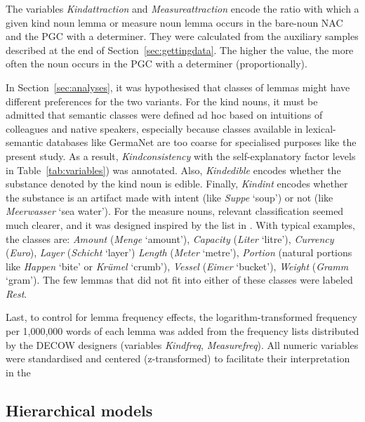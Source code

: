 \documentclass[USenglish]{article}
\begin{document}
The variables \textit{Kindattraction} and \textit{Measureattraction} encode the ratio with which a given kind noun lemma or measure noun lemma occurs in the bare-noun NAC and the PGC with a determiner.
They were calculated from the auxiliary samples described at the end of Section~\ref{sec:gettingdata}.
The higher the value, the more often the noun occurs in the PGC with a determiner (proportionally).

In Section~\ref{sec:analyses}, it was hypothesised that classes of lemmas might have different preferences for the two variants.
For the kind nouns, it must be admitted that semantic classes were defined ad hoc based on intuitions of colleagues and native speakers, especially because classes available in lexical-semantic databases like GermaNet \citep{HampFeldweg1997} are too coarse for specialised purposes like the present study.
As a result, \textit{Kindconsistency} with the self-explanatory factor levels in Table~\ref{tab:variables}) was annotated.
Also, \textit{Kindedible} encodes whether the substance denoted by the kind noun is edible.
Finally, \textit{Kindint} encodes whether the substance is an artifact made with intent (like \textit{Suppe} `soup') or not (like \textit{Meerwasser} `sea water').
For the measure nouns, relevant classification seemed much clearer, and it was designed inspired by the list in \cite[530]{Koptjevskaja2001}.
With typical examples, the classes are:
\textit{Amount} (\textit{Menge} `amount'), 
\textit{Capacity} (\textit{Liter} `litre'), 
\textit{Currency} (\textit{Euro}), 
\textit{Layer} (\textit{Schicht} `layer')
\textit{Length} (\textit{Meter} `metre'), 
\textit{Portion} (natural portions like \textit{Happen} `bite' or \textit{Krümel} `crumb'), 
\textit{Vessel} (\textit{Eimer} `bucket'), 
\textit{Weight} (\textit{Gramm} `gram').
The few lemmas that did not fit into either of these classes were labeled \textit{Rest}.

Last, to control for lemma frequency effects, the logarithm-transformed frequency per 1,000,000 words of each lemma was added from the frequency lists distributed by the DECOW designers (variables \textit{Kindfreq}, \textit{Measurefreq}).
All numeric variables were standardised and centered (z-transformed) to facilitate their interpretation in the 



\subsection{Hierarchical models}
\label{sec:corpushierarchicalmodel}
\end{document}
